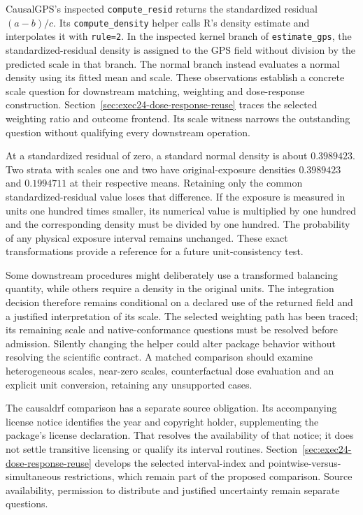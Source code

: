 CausalGPS's inspected \texttt{compute\_resid} returns the standardized residual
$(a-b)/c$. Its \texttt{compute\_density} helper calls R's density estimate and
interpolates it with \texttt{rule=2}. In the inspected kernel branch of
\texttt{estimate\_gps}, the standardized-residual density is assigned to the
GPS field without division by the predicted scale in that branch. The normal
branch instead evaluates a normal density using its fitted mean and scale.
These observations establish a concrete scale question for downstream matching,
weighting and dose-response construction. Section~\ref{sec:exec24-dose-response-reuse}
traces the selected weighting ratio and outcome frontend. Its scale witness
narrows the outstanding question without qualifying every downstream operation. \citep{v13_sw_causalgps,v131_sw_causalgps}

At a standardized residual of zero, a standard normal density is about
$0.3989423$. Two strata with scales one and two have original-exposure densities
$0.3989423$ and $0.1994711$ at their respective means. Retaining only the common
standardized-residual value loses that difference. If the exposure is measured
in units one hundred times smaller, its numerical value is multiplied by one
hundred and the corresponding density must be divided by one hundred. The
probability of any physical exposure interval remains unchanged. These exact
transformations provide a reference for a future unit-consistency test.
\citep{v131_project_semantics}

Some downstream procedures might deliberately use a transformed balancing
quantity, while others require a density in the original units. The integration decision therefore remains conditional on a declared use of
the returned field and a justified interpretation of its scale. The selected
weighting path has been traced; its remaining scale and native-conformance
questions must be resolved before admission. Silently changing the helper
could alter package behavior without resolving the scientific contract. A
matched comparison should examine heterogeneous scales, near-zero scales,
counterfactual dose evaluation and an explicit unit conversion, retaining any
unsupported cases.

The causaldrf comparison has a separate source obligation. Its accompanying
license notice identifies the year and copyright holder, supplementing the
package's license declaration. That resolves the availability of that notice;
it does not settle transitive licensing or qualify its interval routines.
Section~\ref{sec:exec24-dose-response-reuse} develops the selected interval-index
and pointwise-versus-simultaneous restrictions, which remain part of the
proposed comparison. Source availability, permission to distribute and justified
uncertainty remain separate questions. \citep{v131_sw_causaldrf}

